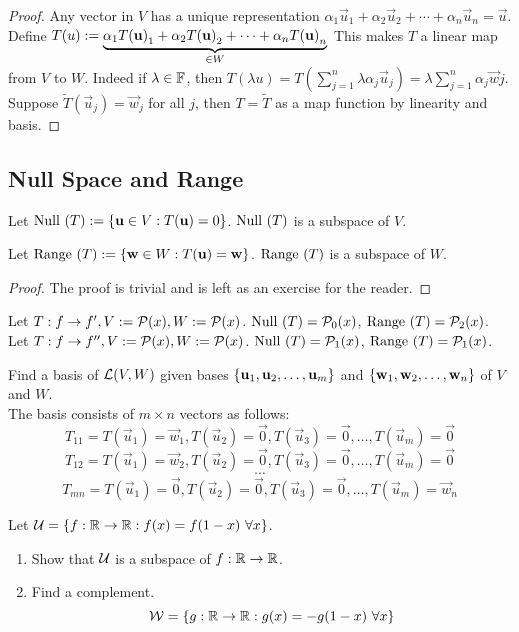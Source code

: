 \begin{proof}
    Any vector in $V$ has a unique representation $\alpha_1\vec u_1 + \alpha_2\vec u_2 + \cdots + \alpha_n \vec u_n = \vec u$.  \\ Define $T(u):= \underbrace{{\alpha}_1{T(\mathbf u)}_1 + {\alpha}_2{T(\mathbf u)}_2 + \cdots + {\alpha}_{n}{T(\mathbf u)}_{n}}_{\in W}$ This makes $T$ a linear map from $V$ to $W$. Indeed if $\lambda \in \mathbb F$, then $T(\lambda u) = T(\sum_{j = 1}^n \lambda \alpha_j \vec u_j) = \lambda \sum_{j = 1}^n \alpha_j \vec wj$. Suppose $\tilde T(\vec u_j) = \vec w_j$ for all $j$, then $T = \tilde T$ as a map function by linearity and basis.
\end{proof}
\subsection{Null Space and Range}
\begin{theorem}
    Let $\text{Null } (T):= \left\{ \mathbf u \in V : T(\mathbf u) = 0 \right\}$. $\text{Null } (T)$ is a subspace of $V$.
\end{theorem}
\begin{theorem}
    Let $\text{Range } (T):= \left\{ \mathbf w \in W : T(\mathbf u) = \mathbf w \right\}$. $\text{Range }(T)$ is a subspace of $W$.
\end{theorem}
\begin{proof}
    The proof is trivial and is left as an exercise for the reader.
\end{proof}
\begin{example}
    Let $T: f \to f', V:= \mathcal P(x), W:= \mathcal P(x)$. $\text{Null }(T) = \mathcal P_0(x)$, $\text{Range }(T) = \mathcal P_2(x)$. \\
    Let $T: f \to f'', V:= \mathcal P(x), W:= \mathcal P(x)$. $\text{Null }(T) = \mathcal P_1(x)$, $\text{Range }(T) = \mathcal P_1(x)$.
\end{example}
\begin{example}
    Find a basis of $\mathcal L (V,W)$ given bases $\left\{ {\mathbf u}_1,{\mathbf u}_2, \ldots, {\mathbf u}_{m} \right\}$ and $\left\{ {\mathbf w}_1,{\mathbf w}_2, \ldots, {\mathbf w}_{n} \right\}$ of $V$ and $W$. \\
    The basis consists of $m \times n$ vectors as follows: 
    \[T_{11} = T(\vec u_1) = \vec w_1, T(\vec u_2) = \vec 0, T(\vec u_3) = \vec 0, \ldots ,T(\vec u_m) = \vec 0\]
    \[T_{12} = T(\vec u_1) = \vec w_2, T(\vec u_2) = \vec 0, T(\vec u_3) = \vec 0, \ldots ,T(\vec u_m) = \vec 0\]
    \[ \cdots \]
    \[T_{mn} = T(\vec u_1) = \vec 0, T(\vec u_2) = \vec 0, T(\vec u_3) = \vec 0, \ldots ,T(\vec u_m) = \vec w_n\]
\end{example}
\begin{example}
    Let $\mathcal U = \left\{ f : \mathbb R \to \mathbb R : f(x) = f(1-x) \ \forall x \right\}$.
    \begin{enumerate}
        \item Show that $\mathcal U$ is a subspace of $f: \mathbb R \to \mathbb R$. 
        
        \item Find a complement.
        \[ \mathcal W  = \left\{ g : \mathbb R \to \mathbb R : g(x) = -g(1 - x) \ \forall x \right\}\]
        
    \end{enumerate}
\end{example}
